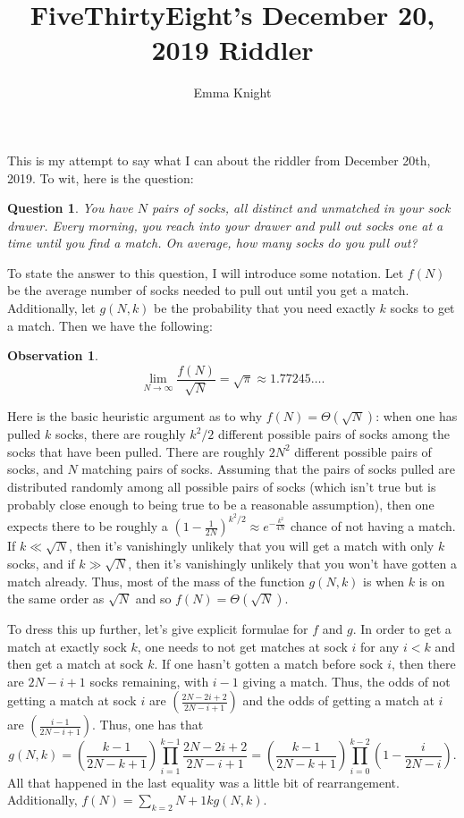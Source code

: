 \documentclass[11pt]{article}
\title{FiveThirtyEight's December 20, 2019 Riddler}
\author{Emma Knight}
\newtheorem{question}[theorem]{Question}
\newtheorem{observation}[theorem]{Observation}
\theoremstyle{definition}
\begin{document}
\maketitle
This is my attempt to say what I can about the riddler from December 20th, 2019.  To wit, here is the question:
\begin{question}
You have $N$ pairs of socks, all distinct and unmatched in your sock drawer.  Every morning, you reach into your drawer and pull out socks one at a time until you find a match.  On average, how many socks do you pull out?
\end{question}
To state the answer to this question, I will introduce some notation.  Let $f(N)$ be the average number of socks needed to pull out until you get a match.  Additionally, let $g(N, k)$ be the probability that you need exactly $k$ socks to get a match.  Then we have the following:
\begin{observation}\label{main}
$$\lim_{N\rightarrow\infty} \frac{f(N)}{\sqrt{N}} = \sqrt{\pi} \approx 1.77245\ldots.$$
\end{observation}

Here is the basic heuristic argument as to why $f(N) = \Theta(\sqrt{N})$: when one has pulled $k$ socks, there are roughly $k^2/2$ different possible pairs of socks among the socks that have been pulled.  There are roughly $2N^2$ different possible pairs of socks, and $N$ matching pairs of socks.  Assuming that the pairs of socks pulled are distributed randomly among all possible pairs of socks (which isn't true but is probably close enough to being true to be a reasonable assumption), then one expects there to be roughly a $\left(1-\frac{1}{2N}\right)^{k^2/2} \approx e^{-\frac{k^2}{4N}}$ chance of not having a match.  If $k \ll \sqrt{N}$, then it's vanishingly unlikely that you will get a match with only $k$ socks, and if $k \gg \sqrt{N}$, then it's vanishingly unlikely that you won't have gotten a match already.  Thus, most of the mass of the function $g(N,k)$ is when $k$ is on the same order as $\sqrt{N}$ and so $f(N) = \Theta(\sqrt{N})$.

To dress this up further, let's give explicit formulae for $f$ and $g$.  In order to get a match at exactly sock $k$, one needs to not get matches at sock $i$ for any $i < k$ and then get a match at sock $k$.  If one hasn't gotten a match before sock $i$, then there are $2N-i+1$ socks remaining, with $i-1$ giving a match.  Thus, the odds of not getting a match at sock $i$ are $\left(\frac{2N-2i+2}{2N-i+1}\right)$ and the odds of getting a match at $i$ are $\left(\frac{i-1}{2N-i+1}\right)$.  Thus, one has that $$g(N,k) = \left(\frac{k-1}{2N-k+1}\right)\prod_{i = 1}^{k-1}\frac{2N-2i+2}{2N-i+1} =  \left(\frac{k-1}{2N-k+1}\right)\prod_{i = 0}^{k-2}\left(1-\frac{i}{2N-i}\right).$$
All that happened in the last equality was a little bit of rearrangement.  Additionally, $f(N) = \sum_{k=2}{N+1} kg(N,k)$.  
\end{document}
